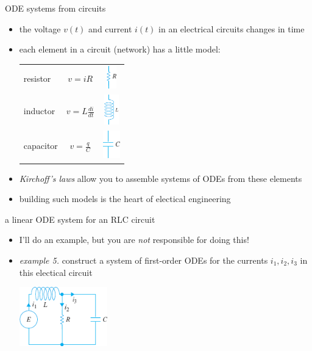 \documentclass[dvipsnames,colorlinks]{beamer}
\begin{document}
\begin{frame}{ODE systems from circuits}

\begin{itemize}
\item the voltage $v(t)$ and current $i(t)$ in an electrical circuits changes in time
\item each element in a circuit (network) has a little model:

\begin{tabular}{lcc}
resistor & $v = iR$ & \includegraphics[height=10mm,trim=0 3mm 0 -3mm]{figs/circuit-element-R} \\
inductor & $v = L \frac{di}{dt}$ & \includegraphics[height=13mm,trim=0 5mm 0 -5mm]{figs/circuit-element-L} \\
capacitor & $v = \frac{q}{C}$ & \includegraphics[height=12mm,trim=0 5mm 0 -5mm]{figs/circuit-element-C}
\end{tabular}

\bigskip \bigskip
\item \emph{Kirchoff's laws} allow you to assemble systems of ODEs from these elements
\item building such models is the heart of electical engineering
\end{itemize}
\end{frame}


\begin{frame}{a linear ODE system for an RLC circuit}

\begin{itemize}
\item I'll do an example, but you are \emph{not} responsible for doing this!
\item \emph{example 5.} construct a system of first-order ODEs for the currents $i_1,i_2,i_3$ in this electical circuit

\bigskip
\includegraphics[width=0.3\textwidth]{figs/new-rlc-circuit}
\end{itemize}

\vspace{30mm}
\end{frame}
\end{document}
